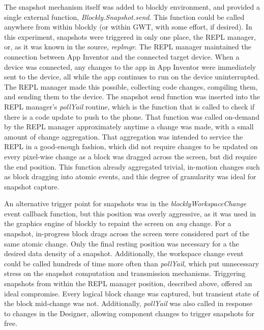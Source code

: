 The snapshot mechanism itself was added to blockly environment, and provided a single external function, \emph{Blockly.Snapshot.send}. This function could be called anywhere from within blockly (or within GWT, with some effort, if desired). In this experiment, snapshots were triggered in only one place, the REPL manager, or, as it was known in the source, \emph{replmgr}. The REPL manager maintained the connection between App Inventor and the connected target device. When a device was connected, any changes to the app in App Inventor were immediately sent to the device, all while the app continues to run on the device uninterrupted. The REPL manager made this possible, collecting code changes, compiling them, and sending them to the device. The snapshot send function was inserted into the REPL manager's \emph{pollYail} routine, which is the function that is called to check if there is a code update to push to the phone. That function was called on-demand by the REPL manager approximately anytime a change was made, with a small amount of change aggregation. That aggregation was intended to service the REPL in a good-enough fashion, which did not require changes to be updated on every pixel-wise change as a block was dragged across the screen, but did require the end position. This function already aggregated trivial, in-motion changes such as block dragging into atomic events, and this degree of granularity was ideal for snapshot capture. 

An alternative trigger point for snapshots was in the \emph{blocklyWorkspaceChange} event callback function, but this position was overly aggressive, as it was used in the graphics engine of blockly to repaint the screen on \emph{any} change. For a snapshot, in-progress block drags across the screen were considered part of the same atomic change. Only the final resting position was necessary for a the desired data density of a snapshot. Additionally, the workspace change event could be called hundreds of time more often than \emph{pollYail,} which put unnecessary stress on the snapshot computation and transmission mechanisms. Triggering snapshots from within the REPL manager position, described above, offered an ideal compromise. Every logical block change was captured, but transient state of the block mid-change was not. Additionally, \emph{pollYail} was also called in response to changes in the Designer, allowing component changes to trigger snapshots for free.

